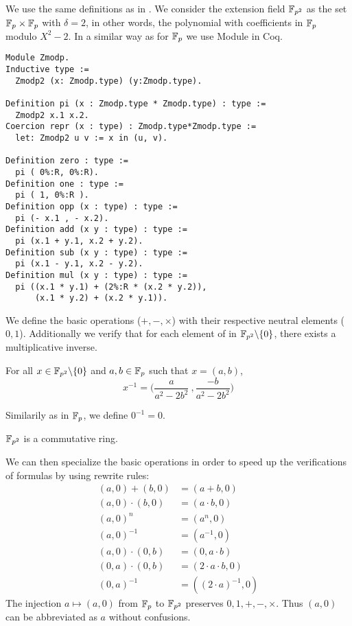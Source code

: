 We use the same definitions as in \cite{Ber06}. We consider the extension field $\mathbb{F}_{p^2}$ as the set $\mathbb{F}_{p} \times \mathbb{F}_{p}$ with $\delta = 2$, in other words,
the polynomial with coefficients in $\mathbb{F}_{p}$ modulo $X^2 - 2$. In a similar way as for $\mathbb{F}_{p}$ we use Module in Coq.
\begin{lstlisting}[language=Coq]
Module Zmodp.
Inductive type :=
  Zmodp2 (x: Zmodp.type) (y:Zmodp.type).

Definition pi (x : Zmodp.type * Zmodp.type) : type :=
  Zmodp2 x.1 x.2.
Coercion repr (x : type) : Zmodp.type*Zmodp.type :=
  let: Zmodp2 u v := x in (u, v).

Definition zero : type :=
  pi ( 0%:R, 0%:R).
Definition one : type :=
  pi ( 1, 0%:R ).
Definition opp (x : type) : type :=
  pi (- x.1 , - x.2).
Definition add (x y : type) : type :=
  pi (x.1 + y.1, x.2 + y.2).
Definition sub (x y : type) : type :=
  pi (x.1 - y.1, x.2 - y.2).
Definition mul (x y : type) : type :=
  pi ((x.1 * y.1) + (2%:R * (x.2 * y.2)),
      (x.1 * y.2) + (x.2 * y.1)).
\end{lstlisting}
We define the basic operations ($+, -, \times$) with their respective neutral elements ($0, 1$).
Additionally we verify that for each element of in $\mathbb{F}_{p^2}\backslash\{0\}$, there exists a multiplicative inverse.
\begin{lemma} For all $x \in \mathbb{F}_{p^2}\backslash\{0\}$ and $a,b \in \mathbb{F}_{p}$ such that $x = (a,b)$,
$$x^{-1} = \Big(\frac{a}{a^2-2b^2}\ , \frac{-b}{a^2-2b^2}\Big)$$
\end{lemma}
Similarily as in $\mathbb{F}_{p}$, we define $0^{-1} = 0$.
\begin{lemma}
$\mathbb{F}_{p^2}$ is a commutative ring.
\end{lemma}
We can then specialize the basic operations in order to speed up the verifications of formulas by using rewrite rules:
\begin{align*}
(a,0) + (b,0) &= (a+b, 0)\\
(a,0) \cdot   (b,0) &= (a \cdot b, 0)\\
(a, 0)^n &= (a^n, 0)\\
(a, 0)^{-1} &= (a^{-1}, 0)\\
(a, 0)\cdot (0,b) &= (0, a\cdot b)\\
(0, a)\cdot (0,b) &= (2\cdot a\cdot b, 0)\\
(0,a)^{-1} &= ((2\cdot a)^{-1},0)
\end{align*}
The injection $a \mapsto (a,0)$ from $\mathbb{F}_{p}$ to $\mathbb{F}_{p^2}$ preserves $0, 1, +, -, \times$. Thus $(a,0)$ can be abbreviated as $a$ without confusions.


